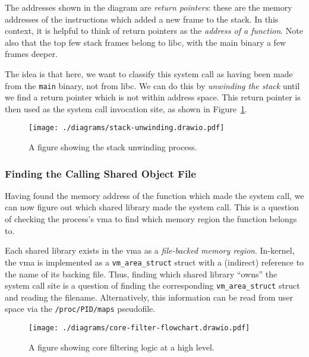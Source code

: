 The addresses shown in the diagram are \textit{return pointers}: these are the
memory addresses of the instructions which added a new frame to the stack. In this
context, it is helpful to think of return pointers as the \textit{address of a
function}. Note also that the top few stack frames belong to \ac{libc}, with
the main binary a few frames deeper.

The idea is that here, we want to classify this system call as having been made from
the \texttt{main} binary, not from \ac{libc}. We can do this by
\textit{unwinding the stack} until we find a return pointer which is not within
 address space. This return pointer is then used as the system call
invocation site, as shown in Figure~\ref{fig:stack-unwinding}.

\begin{figure}[ht]
    \centering
    \texttt{[image: ./diagrams/stack-unwinding.drawio.pdf]} 
    \caption{A figure showing the stack unwinding process.}
    \label{fig:stack-unwinding}
\end{figure}

\subsubsection{Finding the Calling Shared Object File}\label{subsubsec:find_so}

Having found the memory address of the function which made the system call, we
can now figure out which shared library made the system call. This is a
question of checking the process's \ac{vma} to find which memory region the
function belongs to. 

Each shared library exists in the \ac{vma} as a \textit{file-backed memory region}.
In-kernel, the \ac{vma} is implemented as a \texttt{vm\_area\_struct} struct with a
(indirect) reference to the name of its backing file. Thus, finding which
shared library ``owns'' the system call site is a question of finding the
corresponding \texttt{vm\_area\_struct} struct and reading the filename.
Alternatively, this information can be read from user space via the
\texttt{/proc/PID/maps} pseudofile.

\begin{figure}[h]
    \centering
    \texttt{[image: ./diagrams/core-filter-flowchart.drawio.pdf]}
    \caption{A figure showing \afg core filtering logic at a high level.}
    \label{fig:core-filter-flowchart}
\end{figure}

